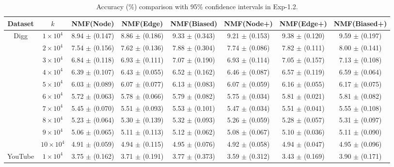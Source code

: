 \documentclass[10pt,journal,compsoc]{IEEEtran}
\newcommand{\Node}{{\sf NMF(Node)}\xspace}
\newcommand{\Edge}{{\sf NMF(Edge)}\xspace}
\newcommand{\Biased}{{\sf NMF(Biased)}\xspace}
\newcommand{\Digg}{{\sf Digg}\xspace}
\newcommand{\YouTube}{{\sf YouTube}\xspace}
\newcommand{\Nodep}{{\sf NMF(Node+)}\xspace}
\newcommand{\Edgep}{{\sf NMF(Edge+)}\xspace}
\newcommand{\Biasedp}{{\sf NMF(Biased+)}\xspace}
\begin{document}
\begin{table}
\caption{Accuracy (\%) comparison with 95\% confidence intervals in Exp-1.2.}
\label{tab_accuracy_1}
\vspace{-2ex}
\centering
\newcommand{\tabincell}[2]{\begin{tabular}{@{}#1@{}}#2\end{tabular}}
\begin{tabular}{c|c|c|c|c|c|c|c}
\hline \hline Dataset  & $k$ & \Node & \Edge & \Biased & \Nodep & \Edgep & \Biasedp  \\
\hline
\multirow{10}{*}{\Digg}
 & $1 \times 10^4 $ & 8.94 $\pm$ (0.147) & 8.86 $\pm$ (0.186) & 9.33 $\pm$ (0.343) & 9.21 $\pm$ (0.153) & 9.38 $\pm$ (0.120) & 9.59 $\pm$ (0.197) \\
 & $2 \times 10^4 $ & 7.54 $\pm$ (0.156) & 7.62 $\pm$ (0.136) & 7.88 $\pm$ (0.304) & 7.74 $\pm$ (0.086) & 7.82 $\pm$ (0.111) & 8.00 $\pm$ (0.141)  \\
 & $3 \times 10^4 $ & 6.84 $\pm$ (0.118) & 6.93 $\pm$ (0.111) & 7.07 $\pm$ (0.190) & 6.93 $\pm$ (0.114) & 7.05 $\pm$ (0.157) & 7.13 $\pm$ (0.108)  \\
 & $4 \times 10^4 $ & 6.39 $\pm$ (0.107) & 6.43 $\pm$ (0.055) & 6.52 $\pm$ (0.162) & 6.46 $\pm$ (0.087) & 6.57 $\pm$ (0.119) & 6.59 $\pm$ (0.064) \\
 & $5 \times 10^4 $ & 6.03 $\pm$ (0.089) & 6.07 $\pm$ (0.077) & 6.13 $\pm$ (0.083) & 6.07 $\pm$ (0.059) & 6.16 $\pm$ (0.055) & 6.17 $\pm$ (0.075)  \\
 & $6 \times 10^4 $ & 5.72 $\pm$ (0.063) & 5.78 $\pm$ (0.066) & 5.79 $\pm$ (0.082) & 5.75 $\pm$ (0.034) & 5.81 $\pm$ (0.021) & 5.81 $\pm$ (0.082)  \\
 & $7 \times 10^4 $ & 5.45 $\pm$ (0.070) & 5.51 $\pm$ (0.093) & 5.53 $\pm$ (0.101) & 5.47 $\pm$ (0.034) & 5.51 $\pm$ (0.041) & 5.55 $\pm$ (0.108)  \\
 & $8 \times 10^4 $ & 5.23 $\pm$ (0.064) & 5.30 $\pm$ (0.139) & 5.32 $\pm$ (0.093) & 5.26 $\pm$ (0.059) & 5.28 $\pm$ (0.057) & 5.31 $\pm$ (0.097)  \\
 & $9 \times 10^4 $ & 5.06 $\pm$ (0.065) & 5.11 $\pm$ (0.113) & 5.12 $\pm$ (0.062) & 5.08 $\pm$ (0.067) & 5.10 $\pm$ (0.036) & 5.11 $\pm$ (0.090)  \\
 & $10 \times 10^4 $ & 4.91 $\pm$ (0.059) & 4.94 $\pm$ (0.115) & 4.95 $\pm$ (0.076) & 4.92 $\pm$ (0.058) & 4.94 $\pm$ (0.047) & 4.95 $\pm$ (0.096)  \\
\hline
\multirow{10}{*}{\YouTube}
 & $1 \times 10^4 $ & 3.75 $\pm$ (0.162) & 3.71 $\pm$ (0.191) & 3.77 $\pm$ (0.373) & 3.59 $\pm$ (0.312) & 3.43 $\pm$ (0.169) & 3.90 $\pm$ (0.171)  \\

\end{tabular}
\end{table}
\end{document}

